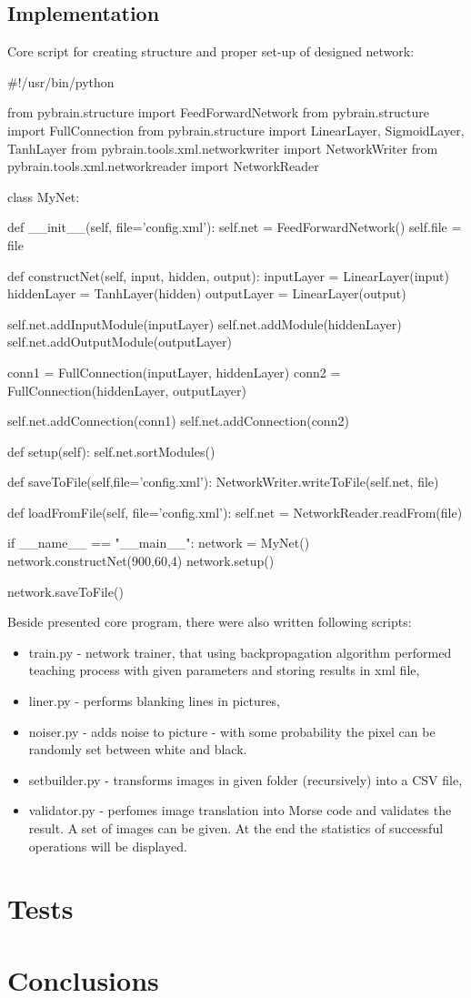 \documentclass[eng,openany]{mgr}
\begin{document}
\section{Implementation}
Core script for creating structure and proper set-up of designed network:
\\
\begin{python}
#!/usr/bin/python

from pybrain.structure import FeedForwardNetwork
from pybrain.structure import FullConnection
from pybrain.structure import LinearLayer, SigmoidLayer, TanhLayer
from pybrain.tools.xml.networkwriter import NetworkWriter
from pybrain.tools.xml.networkreader import NetworkReader

class MyNet:

	def __init__(self, file='config.xml'):
		self.net = FeedForwardNetwork()
		self.file = file

	def constructNet(self, input, hidden, output): 
		inputLayer = LinearLayer(input)
		hiddenLayer = TanhLayer(hidden)
		outputLayer = LinearLayer(output)

		self.net.addInputModule(inputLayer)
		self.net.addModule(hiddenLayer)
		self.net.addOutputModule(outputLayer)

		conn1 = FullConnection(inputLayer, hiddenLayer)
		conn2 = FullConnection(hiddenLayer, outputLayer)

		self.net.addConnection(conn1)
		self.net.addConnection(conn2)

	def setup(self):
		self.net.sortModules()
	
	def saveToFile(self,file='config.xml'):
		NetworkWriter.writeToFile(self.net, file)

	def loadFromFile(self, file='config.xml'):
		self.net = NetworkReader.readFrom(file)

if __name__ == "__main__":
	network = MyNet()
	network.constructNet(900,60,4)
	network.setup()

	network.saveToFile()
\end{python}
Beside presented core program, there were also written following scripts:
\begin{itemize}
\item train.py - network trainer, that using backpropagation algorithm performed teaching process with given parameters and storing results in xml file,
\item liner.py - performs blanking lines in pictures,
\item noiser.py - adds noise to picture - with some probability the pixel can be randomly set between white and black.
\item setbuilder.py - transforms images in given folder (recursively) into a CSV file,
\item validator.py - perfomes image translation into Morse code and validates the result. A set of images can be given. At the end the statistics of successful operations will be displayed.
\end{itemize}

\chapter{Tests}
\chapter{Conclusions}
\end{document}
